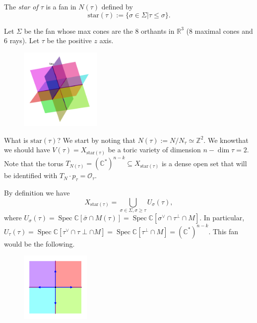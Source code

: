 \documentclass[a4paper,12pt]{amsart}
\newcommand{\ZZ}{\mathbb{Z}}
\newcommand{\RR}{\mathbb{R}}
\newcommand{\CC}{\mathbb{C}}
\newcommand{\OO}{\ensuremath{\mathcal{O}}}
\DeclareMathOperator{\Spec}{Spec}
\begin{document}
\begin{definition}
	The \textit{star of $\tau$} is a fan in $N(\tau)$ defined by
	$$\text{star}(\tau):=\{\sigma\in\Sigma|\tau\leq\sigma\}.$$
\end{definition}

\begin{example}
	Let $\Sigma$ be the fan whose max cones are the 8 orthants in $\RR^3$ (8 maximal cones and 6 rays). Let $\tau$ be the positive $z$ axis.
	
	\begin{figure}[h]
		\centering
		\includegraphics[width=0.35\textwidth]{pic/Mar21_fan1}
	\end{figure}
	
	What is $\text{star}(\tau)$? We start by noting that $N(\tau):=N/N_\tau\simeq\ZZ^2$. We knowthat we should have $V(\tau)=X_{\text{star}(\tau)}$ be a toric variety of dimension $n-\dim\tau=2$. Note that the torus $T_{N(\tau)}=(\CC^*)^{n-k}\subseteq X_{\text{star}(\tau)}$ is a dense open set that will be identified with $T_N\cdot p_\tau=\OO_\tau$. 
	
	By definition we have
	$$X_{\text{star}(\tau)}=\bigcup_{\sigma\in\Sigma,\sigma\geq\tau}U_\sigma(\tau),$$
	where $U_\sigma(\tau)=\Spec\CC[\bar{\sigma}\cap M(\tau)]=\Spec\CC[\sigma^\vee\cap\tau^\perp\cap M]$. In particular, $U_\tau(\tau)=\Spec\CC[\tau^\vee\cap\tau\perp\cap M]=\Spec\CC[\tau^\perp\cap M]=(\CC^*)^{n-k}$. This fan would be the following.
	
	\begin{figure}[h]
		\centering
		\includegraphics[width=0.3\textwidth]{pic/Mar21_fan2}
	\end{figure}
	

\end{example}
\end{document}

